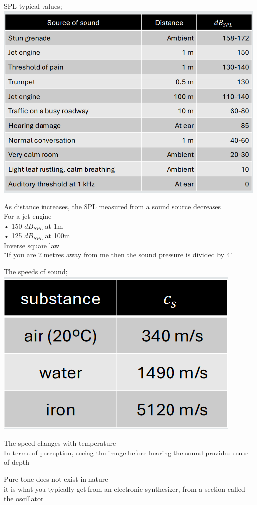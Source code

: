\documentclass[]{project_plan}
\begin{document}
SPL typical values;\\
\includegraphics[width=\linewidth]{SPL_typical_values.png}

As distance increases, the SPL measured from a sound source decreases\\
For a jet engine\\
• 150 $dB_{SPL}$ at 1m\\
• 125 $dB_{SPL}$ at 100m\\
Inverse square law\\
"If you are 2 metres away from me then the sound pressure is divided by 4"

\newpage

The speeds of sound;\\
\includegraphics[width=0.5\linewidth]{speeds_of_sound.png}

The speed changes with temperature\\
In terms of perception, seeing the image before hearing the sound provides sense of depth

Pure tone does not exist in nature\\
it is what you typically get from an electronic synthesizer, from a section called the oscillator
\end{document}
